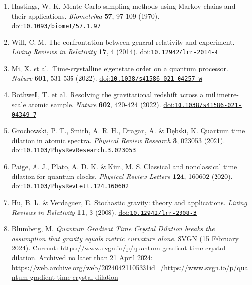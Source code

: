 \documentclass[
  american,
  11pt,
  letterpaper,
]{article}
\begin{document}
\begin{enumerate}
  Metropolis, N. et al.~Equation of state calculations by fast computing machines. \emph{Journal of Chemical Physics} \textbf{21}, 1087-1092 (1953). \href{https://doi.org/10.1063/1.1699114}{doi:\nolinkurl{10.1063/1.1699114}}
\item
  Hastings, W. K. Monte Carlo sampling methods using Markov chains and their applications. \emph{Biometrika} \textbf{57}, 97-109 (1970). \href{https://doi.org/10.1093/biomet/57.1.97}{doi:\nolinkurl{10.1093/biomet/57.1.97}}
\item
  Will, C. M. The confrontation between general relativity and experiment. \emph{Living Reviews in Relativity} \textbf{17}, 4 (2014). \href{https://doi.org/10.12942/lrr-2014-4}{doi:\nolinkurl{10.12942/lrr-2014-4}}
\item
  Mi, X. et al.~Time-crystalline eigenstate order on a quantum processor. \emph{Nature} \textbf{601}, 531-536 (2022). \href{https://doi.org/10.1038/s41586-021-04257-w}{doi:\nolinkurl{10.1038/s41586-021-04257-w}}
\item
  Bothwell, T. et al.~Resolving the gravitational redshift across a millimetre-scale atomic sample. \emph{Nature} \textbf{602}, 420-424 (2022). \href{https://doi.org/10.1038/s41586-021-04349-7}{doi:\nolinkurl{10.1038/s41586-021-04349-7}}
\item
  Grochowski, P. T., Smith, A. R. H., Dragan, A. \& Dębski, K. Quantum time dilation in atomic spectra. \emph{Physical Review Research} \textbf{3}, 023053 (2021). \href{https://doi.org/10.1103/PhysRevResearch.3.023053}{doi:\nolinkurl{10.1103/PhysRevResearch.3.023053}}
\item
  Paige, A. J., Plato, A. D. K. \& Kim, M. S. Classical and nonclassical time dilation for quantum clocks. \emph{Physical Review Letters} \textbf{124}, 160602 (2020). \href{https://doi.org/10.1103/PhysRevLett.124.160602}{doi:\nolinkurl{10.1103/PhysRevLett.124.160602}}
\item
  Hu, B. L. \& Verdaguer, E. Stochastic gravity: theory and applications. \emph{Living Reviews in Relativity} \textbf{11}, 3 (2008). \href{https://doi.org/10.12942/lrr-2008-3}{doi:\nolinkurl{10.12942/lrr-2008-3}}
\item
  Blumberg, M. \emph{Quantum Gradient Time Crystal Dilation breaks the assumption that gravity equals metric curvature alone}. SVGN (15 February 2024). Current: \url{https://www.svgn.io/p/quantum-gradient-time-crystal-dilation}. Archived no later than 21 April 2024: \url{https://web.archive.org/web/20240421105331id_/https://www.svgn.io/p/quantum-gradient-time-crystal-dilation}

\end{enumerate}
\end{document}
